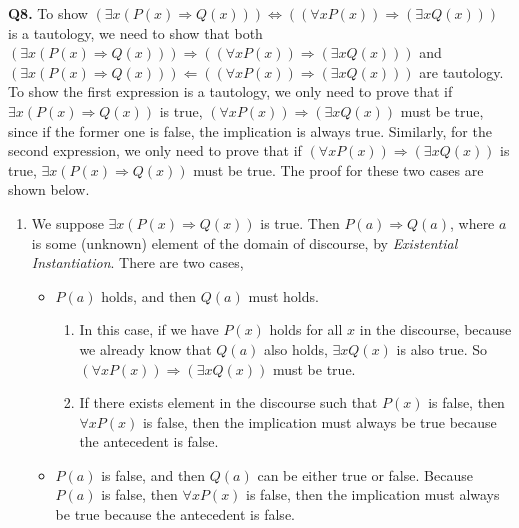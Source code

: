 \documentclass{article}[12pt]
\begin{document}
\noindent \textbf{Q8.}
To show $(\exists x(P(x) \Rightarrow Q(x))) \Longleftrightarrow((\forall x P(x)) \Rightarrow(\exists x Q(x)))$ is a tautology, we need to show that both $(\exists x(P(x) \Rightarrow Q(x))) \Longrightarrow((\forall x P(x)) \Rightarrow(\exists x Q(x)))$ and $(\exists x(P(x) \Rightarrow Q(x))) \Longleftarrow((\forall x P(x)) \Rightarrow(\exists x Q(x)))$ are tautology. To show the first expression is a tautology, we only need to prove that if $\exists x(P(x) \Rightarrow Q(x))$ is true, $(\forall x P(x)) \Rightarrow(\exists x Q(x))$ must be true, since if the former one is false, the implication is always true. Similarly, for the second expression, we only need to prove that if $(\forall x P(x)) \Rightarrow(\exists x Q(x))$  is true, $\exists x(P(x) \Rightarrow Q(x))$ must be true. The proof for these two cases are shown below.
\begin{enumerate}
\item 
We suppose $\exists x(P(x) \Rightarrow Q(x))$ is true.
Then $P(a) \Rightarrow Q(a)$, where $a$ is some (unknown) element of the domain of discourse, by \textit{Existential Instantiation}. There are two cases, 

\begin{itemize}
\item $P(a)$ holds, and then $Q(a)$ must holds.  
\begin{enumerate}
\item In this case, if we have $P(x)$ holds for all $x$ in the discourse, because we already know that $Q(a)$ also holds, $ \exists x Q(x) $ is also true. So $(\forall x P(x)) \Rightarrow(\exists x Q(x))$ must be true.
\item If there exists element in the discourse such that $P(x)$ is false, then $\forall x P(x)$ is false, then the implication must always be true because the antecedent is false. 
\end{enumerate}
\item $P(a)$ is false, and then $Q(a)$ can be either true or false. 
 Because $P(a)$ is false, then $\forall x P(x)$ is false, then the implication must always be true because the antecedent is false. 
\end{itemize}



\end{enumerate}
\end{document}
